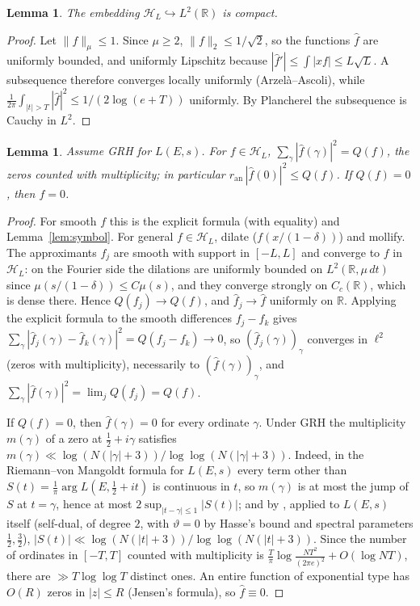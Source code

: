 \documentclass[11pt]{amsart}
\newtheorem{lemma}[theorem]{Lemma}
\theoremstyle{remark}
\theoremstyle{definition}
\newcommand{\R}{\mathbb{R}}
\newcommand{\Hs}{\mathcal{H}_L}
\newcommand{\ran}{r_{\mathrm{an}}}
\begin{document}
\begin{lemma}\label{lem:compact}
The embedding $\Hs\hookrightarrow L^2(\R)$ is compact.
\end{lemma}
\begin{proof}
Let $\|f\|_\mu\le1$. Since $\mu\ge2$, $\|f\|_2\le1/\sqrt2$, so the functions $\hat f$ are uniformly bounded, and uniformly Lipschitz because
$|\hat f'|\le\int|xf|\le L\sqrt L$. A subsequence therefore converges locally uniformly (Arzel\`a--Ascoli), while
$\frac1{2\pi}\int_{|t|>T}|\hat f|^2\le1/(2\log(e+T))$ uniformly. By Plancherel the subsequence is Cauchy in $L^2$.
\end{proof}

\begin{lemma}\label{lem:formula}
Assume GRH for $L(E,s)$. For $f\in\Hs$, $\sum_\gamma|\hat f(\gamma)|^2=Q(f)$, the zeros counted with multiplicity; in particular $\ran\,|\hat f(0)|^2\le Q(f)$.
If $Q(f)=0$, then $f=0$.
\end{lemma}
\begin{proof}
For smooth $f$ this is the explicit formula (with equality) and Lemma~\ref{lem:symbol}. For general $f\in\Hs$, dilate
($f(x/(1-\delta))$) and mollify. The approximants $f_j$ are smooth with support in $[-L,L]$ and converge to $f$ in $\Hs$: on the Fourier side the
dilations are uniformly bounded on $L^2(\R,\mu\,dt)$ since $\mu(s/(1-\delta))\le C\mu(s)$, and they converge strongly on
$C_c(\R)$, which is dense there. Hence $Q(f_j)\to Q(f)$, and $\hat f_j\to\hat f$ uniformly on $\R$. Applying the explicit formula to the smooth differences $f_j-f_k$ gives $\sum_\gamma|\hat f_j(\gamma)-\hat f_k(\gamma)|^2=Q(f_j-f_k)\to0$, so $(\hat f_j(\gamma))_\gamma$ converges in $\ell^2$ (zeros with multiplicity), necessarily to $(\hat f(\gamma))_\gamma$, and $\sum_\gamma|\hat f(\gamma)|^2=\lim_jQ(f_j)=Q(f)$.

If $Q(f)=0$, then $\hat f(\gamma)=0$ for every ordinate $\gamma$. Under GRH the multiplicity $m(\gamma)$ of a zero at $\tfrac12+i\gamma$ satisfies $m(\gamma)\ll\log(N(|\gamma|+3))/\log\log(N(|\gamma|+3))$. Indeed, in the Riemann--von Mangoldt formula for $L(E,s)$ every term other than $S(t)=\frac1\pi\arg L(E,\tfrac12+it)$ is continuous in $t$, so $m(\gamma)$ is at most the jump of $S$ at $t=\gamma$, hence at most $2\sup_{|t-\gamma|\le1}|S(t)|$; and by \cite[Thm.~5, (4.4)]{CChM}, applied to $L(E,s)$ itself (self-dual, of degree $2$, with $\vartheta=0$ by Hasse's bound and spectral parameters $\tfrac12,\tfrac32$), $|S(t)|\ll\log(N(|t|+3))/\log\log(N(|t|+3))$. Since the number of
ordinates in $[-T,T]$ counted with multiplicity is $\frac T\pi\log\frac{NT^2}{(2\pi e)^2}+O(\log NT)$, there are
$\gg T\log\log T$ distinct ones. An entire function of exponential type has $O(R)$ zeros in $|z|\le R$ (Jensen's formula), so
$\hat f\equiv0$.
\end{proof}
\end{document}
